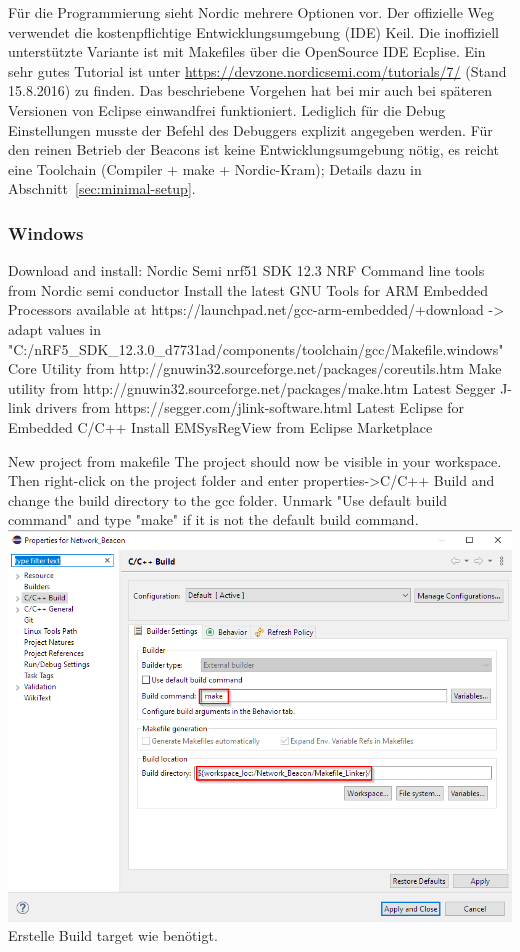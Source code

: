\documentclass[11pt,ngerman]{scrartcl} %
\begin{document}
Für die Programmierung sieht Nordic mehrere Optionen vor. Der offizielle Weg verwendet die kostenpflichtige Entwicklungsumgebung (IDE) Keil. Die inoffiziell unterstützte Variante ist mit Makefiles über die OpenSource IDE Ecplise. Ein sehr gutes Tutorial ist unter \url{https://devzone.nordicsemi.com/tutorials/7/} (Stand 15.8.2016) zu finden. Das beschriebene Vorgehen hat bei mir auch bei späteren Versionen von Eclipse einwandfrei funktioniert. Lediglich für die Debug Einstellungen musste der Befehl des Debuggers explizit angegeben werden. Für den reinen Betrieb der Beacons ist keine Entwicklungsumgebung nötig, es reicht eine Toolchain (Compiler + make + Nordic-Kram); Details dazu in Abschnitt~\ref{sec:minimal-setup}.

\subsubsection{Windows}
Download and install: 
Nordic Semi nrf51 SDK 12.3
NRF Command line tools from Nordic semi conductor
Install the latest GNU Tools for ARM Embedded Processors available at https://launchpad.net/gcc-arm-embedded/+download -> adapt values in "C:/nRF5\_SDK\_12.3.0\_d7731ad/components/toolchain/gcc/Makefile.windows"
Core Utility from http://gnuwin32.sourceforge.net/packages/coreutils.htm
Make utility from http://gnuwin32.sourceforge.net/packages/make.htm
Latest Segger J-link drivers from https://segger.com/jlink-software.html
Latest Eclipse for Embedded C/C++
Install EMSysRegView from Eclipse Marketplace

New project from makefile
The project should now be visible in your workspace. Then right-click on the project folder and enter properties->C/C++ Build and change the build directory to the gcc folder. Unmark "Use default build command" and type "make" if it is not the default build command. 
\includegraphics{EclipseBuildSettings.png}
Erstelle Build target wie benötigt.
\end{document}
